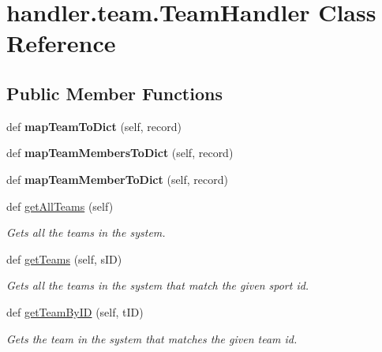 \hypertarget{classhandler_1_1team_1_1_team_handler}{}\section{handler.\+team.\+Team\+Handler Class Reference}
\label{classhandler_1_1team_1_1_team_handler}
\subsection*{Public Member Functions}
\begin{DoxyCompactItemize}
\item 
\mbox{\label{classhandler_1_1team_1_1_team_handler_a59e89a80e2c761139bd0a17ac13f271c}} 
def {\bfseries map\+Team\+To\+Dict} (self, record)
\item 
\mbox{\label{classhandler_1_1team_1_1_team_handler_a6fc415c48d6b7057ecb60dc5f7f3fdb1}} 
def {\bfseries map\+Team\+Members\+To\+Dict} (self, record)
\item 
\mbox{\label{classhandler_1_1team_1_1_team_handler_a931e32e4ac7e2a47c95ca4707fbbe034}} 
def {\bfseries map\+Team\+Member\+To\+Dict} (self, record)
\item 
def \hyperlink{classhandler_1_1team_1_1_team_handler_acc2d42a1a0a2120c25425708fc3274e5}{get\+All\+Teams} (self)
\begin{DoxyCompactList}\small\item\em Gets all the teams in the system. \end{DoxyCompactList}\item 
def \hyperlink{classhandler_1_1team_1_1_team_handler_aeb227f1fec1cfad96ce56cf7de054552}{get\+Teams} (self, s\+ID)
\begin{DoxyCompactList}\small\item\em Gets all the teams in the system that match the given sport id. \end{DoxyCompactList}\item 
def \hyperlink{classhandler_1_1team_1_1_team_handler_ad8844435c8d6951748a7dc17702a2a19}{get\+Team\+By\+ID} (self, t\+ID)
\begin{DoxyCompactList}\small\item\em Gets the team in the system that matches the given team id. \end{DoxyCompactList}\item 

\end{DoxyCompactItemize}
